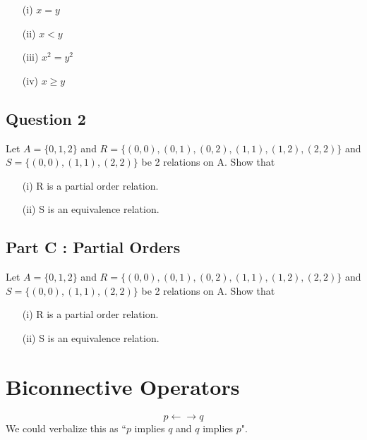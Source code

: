 \documentclass[]{report}
\begin{document}
	\begin{itemize} 
		\item[(i)] $x = y$
		\item[(ii)] $x < y$
		\item[(iii)] $x^2 = y^2$
		\item[(iv)] $x \geq y$
	\end{itemize}
\subsection*{Question 2}


Let $A=\{0,1,2\}$ and $R=\{ (0,0),(0,1),(0,2),(1,1), (1,2), (2,2)\}$
and $S=\{(0,0),(1,1),(2,2)\}$ be 2 relations on A. Show that

\begin{itemize}
	\item[(i)] R is a partial order relation.
	\item[(ii)] S is an equivalence relation.
\end{itemize}

	\subsection*{Part C : Partial Orders}
	
	Let $A=\{0,1,2\}$ and $R=\{ (0,0),(0,1),(0,2),(1,1), (1,2), (2,2)\}$
	and $S=\{(0,0),(1,1),(2,2)\}$ be 2 relations on A. Show that
	
	\begin{itemize}
		\item[(i)] R is a partial order relation.
		\item[(ii)] S is an equivalence relation.
	\end{itemize}
	



\section*{Biconnective Operators}

\[ p \leftarrow \rightarrow q\]
We could verbalize this as ``$p$ implies $q$ and $q$ implies $p$".
\end{document}
